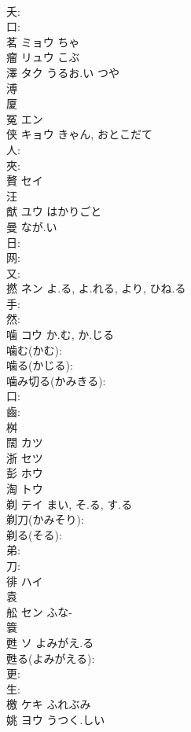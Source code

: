 \documentclass[8pt]{extreport}
\begin{document}
\begin{CJK}{UTF8}{min}
\\	夭: 
\\	口: 
\\	茗	ミョウ ちゃ			
\\	瘤	リュウ こぶ			
\\	澤	タク うるお.い つや			
\\	溥						
\\	厦						
\\	冤	エン			
\\	侠	キョウ	きゃん, おとこだて		
\\	人: 
\\	夾: 
\\	贅	セイ			
\\	汪						
\\	猷	ユウ はかりごと					
\\	曼		なが.い			
\\	日: 
\\	网: 
\\	又: 
\\	撚	ネン	よ.る, よ.れる, より, ひね.る		
\\	手: 
\\	然: 
\\	噛	コウ	か.む, か.じる		
\\	噛む(かむ): 
\\	噛る(かじる): 
\\	噛み切る(かみきる): 
\\	口: 
\\	齒: 
\\	桝						
\\	闊	カツ			
\\	浙	セツ			
\\	彭	ホウ			
\\	淘	トウ			
\\	剃	テイ	まい, そ.る, す.る		
\\	剃刀(かみそり): 
\\	剃る(そる): 
\\	弟: 
\\	刀: 
\\	徘	ハイ			
\\	袁						
\\	舩	セン ふな-					
\\	簑						
\\	甦	ソ	よみがえ.る		
\\	甦る(よみがえる): 
\\	更: 
\\	生: 
\\	檄	ケキ ふれぶみ			
\\	姚	ヨウ うつく.しい			

\end{CJK}
\end{document}
